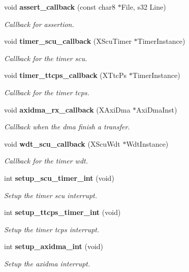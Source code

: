 \begin{DoxyCompactItemize}
\item 
void \textbf{ assert\+\_\+callback} (const char8 $\ast$File, s32 Line)
\begin{DoxyCompactList}\small\item\em Callback for assertion. \end{DoxyCompactList}\item 
void \textbf{ timer\+\_\+scu\+\_\+callback} (X\+Scu\+Timer $\ast$Timer\+Instance)
\begin{DoxyCompactList}\small\item\em Callback for the timer scu. \end{DoxyCompactList}\item 
void \textbf{ timer\+\_\+ttcps\+\_\+callback} (X\+Ttc\+Ps $\ast$Timer\+Instance)
\begin{DoxyCompactList}\small\item\em Callback for the timer tcps. \end{DoxyCompactList}\item 
void \textbf{ axidma\+\_\+rx\+\_\+callback} (X\+Axi\+Dma $\ast$Axi\+Dma\+Inst)
\begin{DoxyCompactList}\small\item\em Callback when the dma finish a transfer. \end{DoxyCompactList}\item 
void \textbf{ wdt\+\_\+scu\+\_\+callback} (X\+Scu\+Wdt $\ast$Wdt\+Instance)
\begin{DoxyCompactList}\small\item\em Callback for the timer wdt. \end{DoxyCompactList}\item 
int \textbf{ setup\+\_\+scu\+\_\+timer\+\_\+int} (void)
\begin{DoxyCompactList}\small\item\em Setup the timer scu interrupt. \end{DoxyCompactList}\item 
int \textbf{ setup\+\_\+ttcps\+\_\+timer\+\_\+int} (void)
\begin{DoxyCompactList}\small\item\em Setup the timer tcps interrupt. \end{DoxyCompactList}\item 
int \textbf{ setup\+\_\+axidma\+\_\+int} (void)
\begin{DoxyCompactList}\small\item\em Setup the axidma interrupt. \end{DoxyCompactList}\item 

\end{DoxyCompactItemize}
